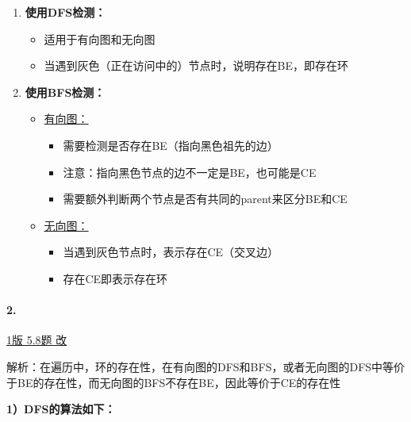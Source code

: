 \documentclass{article}
\begin{document}
\begin{enumerate}
    \item \textbf{使用DFS检测：}
    \begin{itemize}
        \item 适用于有向图和无向图
        \item 当遇到灰色（正在访问中的）节点时，说明存在BE，即存在环
    \end{itemize}

    \item \textbf{使用BFS检测：}
    \begin{itemize}
        \item \underline{有向图：}
        \begin{itemize}
            \item 需要检测是否存在BE（指向黑色祖先的边）
            \item 注意：指向黑色节点的边不一定是BE，也可能是CE
            \item 需要额外判断两个节点是否有共同的parent来区分BE和CE
        \end{itemize}
        \item \underline{无向图：}
        \begin{itemize}
            \item 当遇到灰色节点时，表示存在CE（交叉边）
            \item 存在CE即表示存在环
        \end{itemize}
    \end{itemize}
\end{enumerate}

\pagebreak

\paragraph{2.}

\href{https://github.com/Shannju/njucser_helphelp/blob/main/Algorithm%E7%AE%97%E6%B3%95/%E7%AD%94%E6%A1%88/%E7%AE%97%E6%B3%95%E7%AD%94%E6%A1%88csdn%EF%BC%88%E5%8A%A9%E6%95%99%E5%B7%B2%E5%88%A0%E9%99%A4.pdf}{1版 5.8题 改}

\noindent 解析：在遍历中，环的存在性，在有向图的DFS和BFS，或者无向图的DFS中等价于BE的存在性，而无向图的BFS不存在BE，因此等价于CE的存在性

\noindent\textbf{1）DFS的算法如下：}
\end{document}

